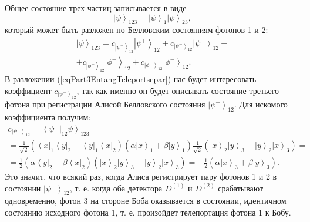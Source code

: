 Общее состояние трех частиц записывается в виде
\begin{equation}
  \left|\psi\right>_{123} = \left|\psi\right>_1 \left|\psi\right>_{23},
  \nonumber
\end{equation}
который может быть разложен по Белловским состояниям фотонов 1 и 2:
\begin{eqnarray}
\left|\psi\right>_{123} = 
c_{\left|\psi^{+}\right>_{12}}\left|\psi^{+}\right>_{12} +
c_{\left|\psi^{-}\right>_{12}}\left|\psi^{-}\right>_{12} +
\nonumber \\
+
c_{\left|\phi^{+}\right>_{12}}\left|\phi^{+}\right>_{12} +
c_{\left|\phi^{-}\right>_{12}}\left|\phi^{-}\right>_{12}.
\label{eqPart3EntangTeleportsepar}
\end{eqnarray}
В разложении (\ref{eqPart3EntangTeleportsepar}) нас будет интересовать
коэффициент 
$c_{\left|\psi^{-}\right>_{12}}$, так как именно он будет описывать
состояние третьего фотона при регистрации Алисой Белловского состояния 
$\left|\psi^{-}\right>_{12}$. Для искомого коэффициента получим:
\begin{eqnarray}
  c_{\left|\psi^{-}\right>_{12}} = 
  \left<\psi^{-}\right|_{12} \left.\psi\right>_{123} = 
  \nonumber \\
  =
  \frac{1}{\sqrt{2}}
  \left(
  \left<x\right|_1\left<y\right|_2 - 
  \left<y\right|_1\left<x\right|_2
  \right)
  \left(
  \alpha \left|x\right>_1 +
  \beta \left|y\right>_1
  \right)
  \frac{1}{\sqrt{2}}
  \left(
  \left|x\right>_2\left|y\right>_3 - 
  \left|y\right>_2\left|x\right>_3
  \right) = 
  \nonumber \\
  = \frac{1}{2}
  \left(
  \alpha\left<y\right|_2 - 
  \beta\left<x\right|_2
  \right)
  \left(
  \left|x\right>_2\left|y\right>_3 - 
  \left|y\right>_2\left|x\right>_3
  \right) = 
  - \frac{1}{2}  
  \left(
  \alpha \left|x\right>_3 +
  \beta \left|y\right>_3
  \right).
\nonumber
\end{eqnarray}
Это значит, что всякий раз, когда Алиса регистрирует пару фотонов 1 и 2
в состоянии $\left|\psi^{-}\right>_{12}$, т. е. когда оба детектора
$D^{(1)}$ и $D^{(2)}$ срабатывают одновременно, фотон 3 на стороне
Боба оказывается в состоянии, идентичном состоянию исходного фотона 1,
т. е. произойдет телепортация фотона 1  к Бобу.


